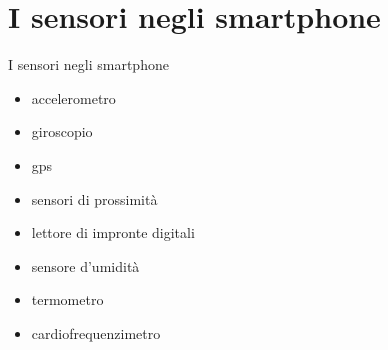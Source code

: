\documentclass{beamer}
\begin{document}
    \section{I sensori negli smartphone}
    \begin{frame}{I sensori negli smartphone}
        \begin{itemize}
            \item accelerometro
            \pause
            \item giroscopio
            \pause
            \item gps
            \pause
            \item sensori di prossimità
            \pause
            \item lettore di impronte digitali
            \pause
            \item sensore d'umidità
            \pause
            \item termometro
            \pause
            \item cardiofrequenzimetro
        \end{itemize}
    \end{frame}
    
\end{document}

